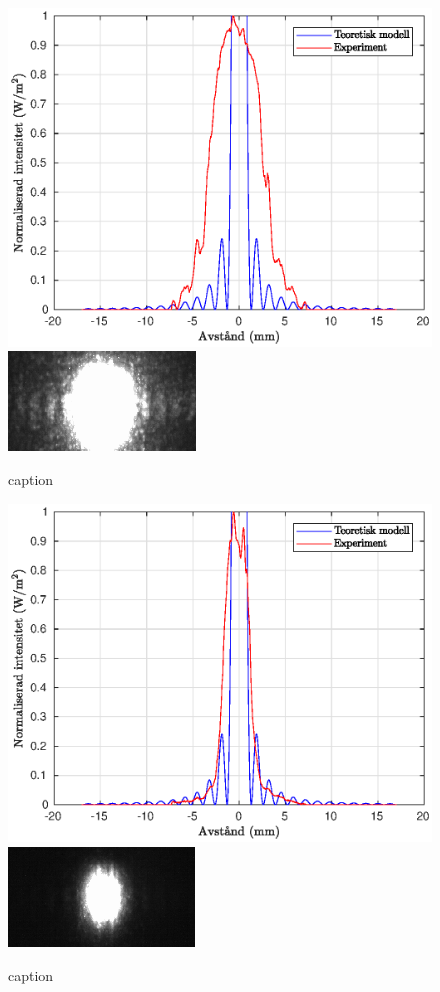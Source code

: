 \documentclass[a4paper]{article}
\begin{document}
\begin{figure}[h!]
	\centering
	\includegraphics[width=0.75\linewidth]{Data/Figurer/tradHogExpo.eps}
	\includegraphics[width=0.5\linewidth]{Data/Figurer/tradHogExpo.png}
	\caption{caption}
	\label{fig:tradHogExpo}
\end{figure}

\begin{figure}[h!]
	\centering
	\includegraphics[width=0.75\linewidth]{Data/Figurer/tradLagExpo.eps}
	\includegraphics[width=0.5\linewidth]{Data/Figurer/tradLagExpo.png}
	\caption{caption}
	\label{fig:tradLagExpo}
\end{figure}
\end{document}
